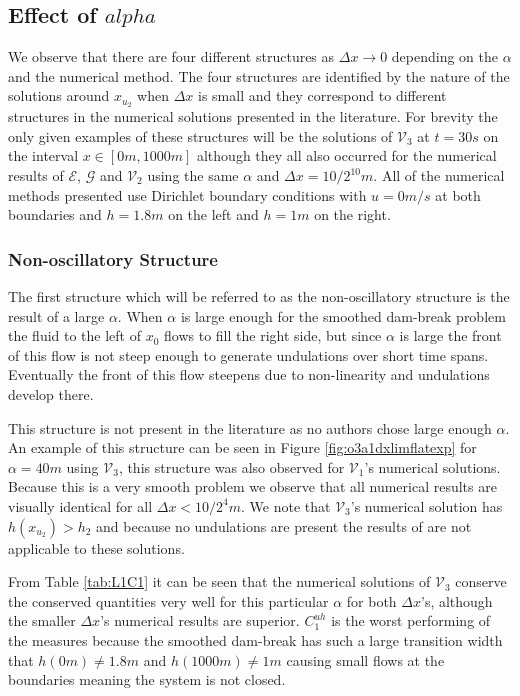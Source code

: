 \documentclass[times]{elsarticle}
\begin{document}
\subsection{Effect of $alpha$}
We observe that there are four different structures as $\Delta x \rightarrow 0$ depending on the $\alpha$ and the numerical method. The four structures are identified by the nature of the solutions around $x_{u_2}$ when $\Delta x$ is small and they correspond to different structures in the numerical solutions presented in the literature. For brevity the only given examples of these structures will be the solutions of $\mathcal{V}_3$ at $t=30s$ on the interval $x\in[0m,1000m]$ although they all also occurred for the numerical results of $\mathcal{E}$, $\mathcal{G}$ and $\mathcal{V}_2$ using the same $\alpha$ and $\Delta x = 10/2^{10}m$. All of the numerical methods presented use Dirichlet boundary conditions with $u = 0m/s$ at both boundaries and $h =1.8m$ on the left and $h =1m$ on the right.

\subsubsection{Non-oscillatory Structure}
The first structure which will be referred to as the non-oscillatory structure is the result of  a large $\alpha$. When $\alpha$ is large enough for the smoothed dam-break problem the fluid to the left of $x_0$ flows to fill the right side, but since $\alpha$ is large the front of this flow is not steep enough to generate undulations over short time spans. Eventually the front of this flow steepens due to non-linearity and undulations develop there.

This structure is not present in the literature as no authors chose large enough $\alpha$. An example of this structure can be seen in Figure \ref{fig:o3a1dxlimflatexp} for $\alpha = 40m$ using $\mathcal{V}_3$, this structure was also observed for $\mathcal{V}_1$'s numerical solutions. Because this is a very smooth problem we observe that all numerical results are visually identical for all $\Delta x < 10 / 2^4m$. We note that $\mathcal{V}_3$'s numerical solution has $h(x_{u_2}) > h_2$ and because no undulations are present the results of \citet{El-etal-2006} are not applicable to these solutions.   

From Table \ref{tab:L1C1} it can be seen that the numerical solutions of $\mathcal{V}_3$ conserve the conserved quantities very well for this particular $\alpha$ for both $\Delta x$'s, although the smaller $\Delta x$'s numerical results are superior. $C^{uh}_1$ is the worst performing of the measures because the smoothed dam-break has such a large transition width that $h(0m) \neq 1.8m$ and $h(1000m) \neq 1m$ causing small flows at the boundaries meaning the system is not closed. 
\end{document}

